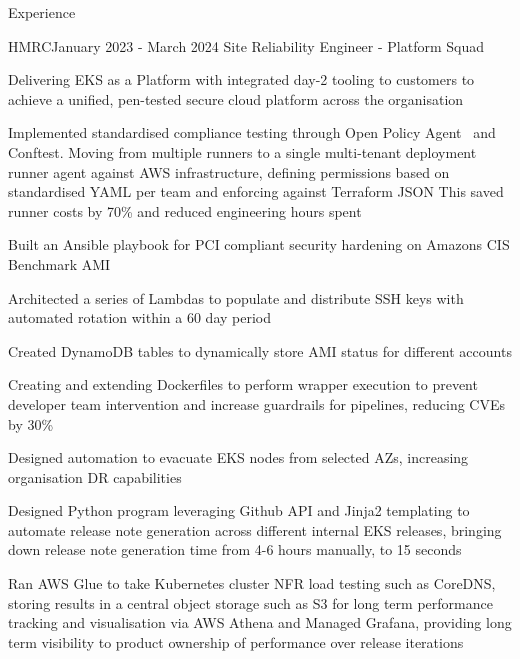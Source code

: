 \documentclass{resume} %
\begin{document}
\begin{rSection}{Experience}
\begin{rSubsection}{HMRC}{January 2023 - March 2024}
{Site Reliability Engineer - Platform Squad}{}
\normalfont
\item Delivering EKS as a Platform with integrated day-2 tooling to customers to achieve a unified, pen-tested secure cloud platform across the organisation
\item Implemented standardised compliance testing through Open Policy Agent \ and  Conftest. Moving from multiple runners to a single multi-tenant deployment runner agent against AWS infrastructure, defining permissions based on standardised YAML per team and enforcing against Terraform JSON This saved runner costs by 70\% and reduced engineering hours spent
\item Built an Ansible playbook for PCI compliant security hardening on Amazons CIS Benchmark AMI
\item Architected a series of Lambdas to populate and distribute SSH keys with automated rotation within a 60 day period
\item Created DynamoDB tables to dynamically store AMI status for different accounts
\item Creating and extending Dockerfiles to perform wrapper execution to prevent developer team intervention and increase guardrails for pipelines, reducing CVEs by 30\%
\item Designed automation to evacuate EKS nodes from selected AZs, increasing organisation DR capabilities
\item Designed Python program leveraging Github API and Jinja2 templating to automate release note generation across different internal EKS releases, bringing down release note generation time from 4-6 hours manually, to 15 seconds
\item Ran AWS Glue to take Kubernetes cluster NFR load testing such as CoreDNS, storing results in a central object storage such as S3 for long term performance tracking and visualisation via AWS Athena and Managed Grafana, providing long term visibility to product ownership of performance over release iterations
\end{rSubsection}


\end{rSection}
\end{document}
